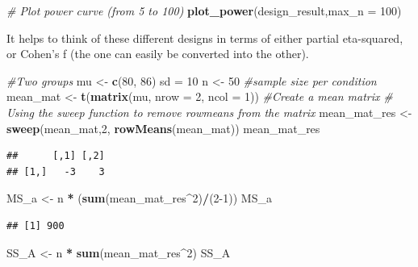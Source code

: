 \documentclass[]{book}
\newenvironment{Shaded}{\begin{snugshade}}{\end{snugshade}}
\newcommand{\CommentTok}[1]{\textcolor[rgb]{0.56,0.35,0.01}{\textit{#1}}}
\newcommand{\DataTypeTok}[1]{\textcolor[rgb]{0.13,0.29,0.53}{#1}}
\newcommand{\DecValTok}[1]{\textcolor[rgb]{0.00,0.00,0.81}{#1}}
\newcommand{\KeywordTok}[1]{\textcolor[rgb]{0.13,0.29,0.53}{\textbf{#1}}}
\newcommand{\NormalTok}[1]{#1}
\newcommand{\OperatorTok}[1]{\textcolor[rgb]{0.81,0.36,0.00}{\textbf{#1}}}
\newcommand{\StringTok}[1]{\textcolor[rgb]{0.31,0.60,0.02}{#1}}
\begin{document}
\begin{Shaded}
\begin{Highlighting}[]
\CommentTok{# Plot power curve (from 5 to 100)}
\KeywordTok{plot_power}\NormalTok{(design_result,}\DataTypeTok{max_n =} \DecValTok{100}\NormalTok{)}
\end{Highlighting}
\end{Shaded}

It helps to think of these different designs in terms of either partial eta-squared, or Cohen's f (the one can easily be converted into the other).

\begin{Shaded}
\begin{Highlighting}[]
\CommentTok{#Two groups}
\NormalTok{mu <-}\StringTok{ }\KeywordTok{c}\NormalTok{(}\DecValTok{80}\NormalTok{, }\DecValTok{86}\NormalTok{)}
\NormalTok{sd =}\StringTok{ }\DecValTok{10}
\NormalTok{n <-}\StringTok{ }\DecValTok{50} \CommentTok{#sample size per condition}
\NormalTok{mean_mat <-}\StringTok{ }\KeywordTok{t}\NormalTok{(}\KeywordTok{matrix}\NormalTok{(mu, }
                     \DataTypeTok{nrow =} \DecValTok{2}\NormalTok{,}
                     \DataTypeTok{ncol =} \DecValTok{1}\NormalTok{)) }\CommentTok{#Create a mean matrix}
\CommentTok{# Using the sweep function to remove rowmeans from the matrix}
\NormalTok{mean_mat_res <-}\StringTok{ }\KeywordTok{sweep}\NormalTok{(mean_mat,}\DecValTok{2}\NormalTok{, }\KeywordTok{rowMeans}\NormalTok{(mean_mat))   }
\NormalTok{mean_mat_res}
\end{Highlighting}
\end{Shaded}

\begin{verbatim}
##      [,1] [,2]
## [1,]   -3    3
\end{verbatim}

\begin{Shaded}
\begin{Highlighting}[]
\NormalTok{MS_a <-}\StringTok{ }\NormalTok{n }\OperatorTok{*}\StringTok{ }\NormalTok{(}\KeywordTok{sum}\NormalTok{(mean_mat_res}\OperatorTok{^}\DecValTok{2}\NormalTok{)}\OperatorTok{/}\NormalTok{(}\DecValTok{2-1}\NormalTok{))}
\NormalTok{MS_a}
\end{Highlighting}
\end{Shaded}

\begin{verbatim}
## [1] 900
\end{verbatim}

\begin{Shaded}
\begin{Highlighting}[]
\NormalTok{SS_A <-}\StringTok{ }\NormalTok{n }\OperatorTok{*}\StringTok{ }\KeywordTok{sum}\NormalTok{(mean_mat_res}\OperatorTok{^}\DecValTok{2}\NormalTok{)}
\NormalTok{SS_A}
\end{Highlighting}
\end{Shaded}
\end{document}
